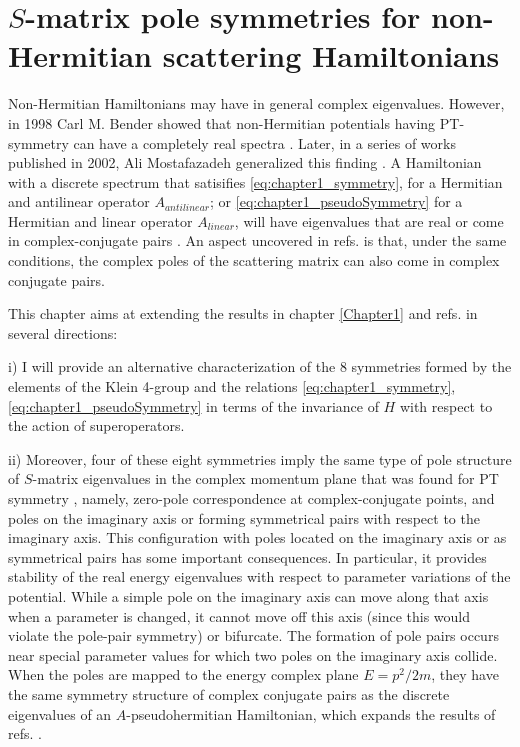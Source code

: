 
\chapter{$S$-matrix pole symmetries for non-Hermitian scattering Hamiltonians}
\label{Chapter2}

Non-Hermitian Hamiltonians may have in general complex eigenvalues. However, in 1998 Carl M. Bender showed that non-Hermitian potentials having PT-symmetry can have a completely real spectra \cite{Bender1998}. Later, in a series of works published in 2002, Ali Mostafazadeh generalized this finding \cite{Mostafazadeh2002,Mostafazadeh2002a,Mostafazadeh2002b}. A Hamiltonian with a discrete spectrum that satisifies \eqref{eq:chapter1_symmetry}, for a Hermitian and antilinear operator $A_{antilinear}$; or \eqref{eq:chapter1_pseudoSymmetry} for a Hermitian and linear operator $A_{linear}$, will have eigenvalues that are real or come in complex-conjugate pairs \cite{Mostafazadeh2002,Mostafazadeh2002a,Mostafazadeh2002b}. An aspect uncovered in refs. \cite{Mostafazadeh2002,Mostafazadeh2002a,Mostafazadeh2002b} is that, under the same conditions, the complex poles of the scattering matrix can also come in complex conjugate pairs.

This chapter aims at extending the results in chapter \ref{Chapter1} and refs. \cite{Mostafazadeh2002,Mostafazadeh2002a,Mostafazadeh2002b} in several directions:

i) I will provide an alternative characterization of the 8 symmetries formed by the elements of the Klein 4-group and the relations \eqref{eq:chapter1_symmetry}, \eqref{eq:chapter1_pseudoSymmetry} in terms of the invariance of $H$ with respect to the action of superoperators.

ii) Moreover,
four of these eight symmetries imply the same
type of pole structure of $S$-matrix eigenvalues in the complex momentum plane that was found for PT symmetry \cite{Muga2004},
namely, zero-pole correspondence at complex-conjugate points, and poles on the imaginary axis or forming symmetrical pairs with respect to the imaginary
axis. This configuration with poles located on the imaginary  axis or as symmetrical pairs has some important consequences. In particular, it provides stability of the real energy eigenvalues with respect to parameter variations of the potential. While a simple pole on the imaginary axis can move along that axis when a parameter is changed, it cannot move off this axis (since this would violate the pole-pair symmetry) or bifurcate. The formation of pole pairs occurs near special  parameter values for which two poles on the imaginary axis collide. When the poles are mapped to the energy complex plane $E = p^2/2m$, they have the same symmetry structure of complex conjugate pairs as the discrete eigenvalues of an $A$-pseudohermitian Hamiltonian, which expands the results of refs. \cite{Mostafazadeh2002,Mostafazadeh2002a,Mostafazadeh2002b}.

